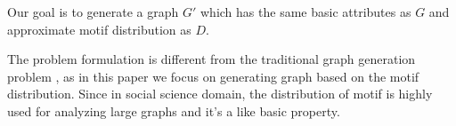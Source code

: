  Our goal is to generate a graph $G'$ which has the same basic attributes as $G$ and approximate motif distribution as $D$.

The problem formulation is different from the traditional graph generation problem \cite{erdds1959random, watts1998collective, albert2002statistical, newman2009random, molloy1995critical}, as in this paper we focus on generating graph based on the motif distribution. Since in social science domain, the distribution of motif is highly used for analyzing large graphs and it's a like basic property.



